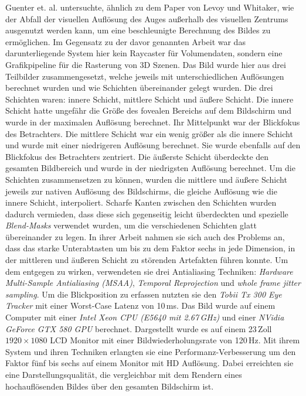 Guenter et. al. \cite{foveated-3d-graphics} untersuchte, ähnlich zu dem Paper von Levoy und Whitaker, wie der Abfall der visuellen Auflösung des Auges außerhalb des visuellen Zentrums ausgenutzt werden kann, um eine beschleunigte Berechnung des Bildes zu ermöglichen.
Im Gegensatz zu der davor genannten Arbeit war das darunterliegende System hier kein Raycaster für Volumendaten, sondern eine Grafikpipeline für die Rasterung von 3D Szenen.
Das Bild wurde hier aus drei Teilbilder zusammengesetzt, welche jeweils mit unterschiedlichen Auflösungen berechnet wurden und wie Schichten übereinander gelegt wurden.
Die drei Schichten waren: innere Schicht, mittlere Schicht und äußere Schicht.
Die innere Schicht hatte ungefähr die Größe des fovealen Bereichs auf dem Bildschirm und wurde in der maximalen Auflösung berechnet.
Ihr Mittelpunkt war der Blickfokus des Betrachters.
Die mittlere Schicht war ein wenig größer als die innere Schicht und wurde mit einer niedrigeren Auflösung berechnet. 
Sie wurde ebenfalls auf den Blickfokus des Betrachters zentriert.
Die äußerste Schicht überdeckte den gesamten Bildbereich und wurde in der niedrigsten Auflösung berechnet.
Um die Schichten zusammensetzen zu können, wurden die mittlere und äußere Schicht jeweils zur nativen Auflösung des Bildschirms, die gleiche Auflösung wie die innere Schicht, interpoliert.
Scharfe Kanten zwischen den Schichten wurden dadurch vermieden, dass diese sich gegenseitig leicht überdeckten und spezielle \emph{Blend-Masks} verwendet wurden, um die verschiedenen Schichten glatt übereinander zu legen.
In ihrer Arbeit nahmen sie sich auch des Problems an, dass das starke Unterabtasten um bis zu dem Faktor sechs in jede Dimension, in der mittleren und äußeren Schicht zu störenden Artefakten führen konnte.
Um dem entgegen zu wirken, verwendeten sie drei Antialiasing Techniken: \emph{Hardware Multi-Sample Antialiasing (MSAA)}, \emph{Temporal Reprojection} und \emph{whole frame jitter sampling}.
Um die Blickposition zu erfassen nutzten sie den \emph{Tobii Tx 300 Eye Tracker} mit einer Worst-Case Latenz von 10\,ms.
Das Bild wurde auf einem Computer mit einer \emph{Intel Xeon CPU (E5640 mit 2.67\,GHz)} und einer \emph{NVidia GeForce GTX 580 GPU} berechnet.
Dargestellt wurde es auf einem 23\,Zoll $1920\times1080$ LCD Monitor mit einer Bildwiederholungsrate von 120\,Hz.
Mit ihrem System und ihren Techniken erlangten sie eine Performanz-Verbesserung um den Faktor fünf bis sechs auf einem Monitor mit HD Auflösung.
Dabei erreichten sie eine Darstellungsqualität, die vergleichbar mit dem Rendern eines hochauflösenden Bildes über den gesamten Bildschirm ist.

